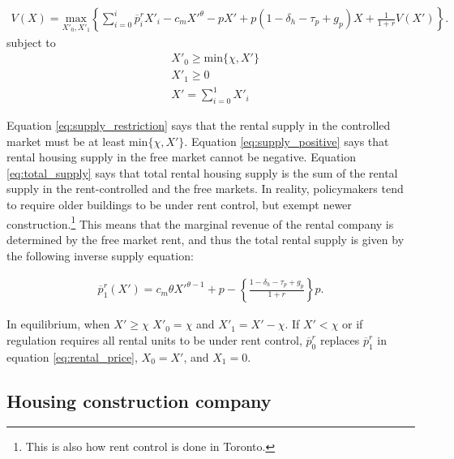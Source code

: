 \documentclass[parskip=full]{article}
\begin{document}

\begin{align}\label{eq:rental_company_problem}
V(X)=\underset{X'_{0},X'_{1}} {\text{$\mbox{max} $}}\left\{\sum_{i=0}^{i} \overline{p}^{r}_{i}X'_{i}-c_{m}X'^{\theta}-p X'+p(1-\delta_{h}-\tau_{p}+g_{p})X+\frac{1}{1+r}V(X')\right\}.
\end{align}
subject to
\begin{align}
& X'_{0} \geq \mbox{min}\{\chi,X'\} \label{eq:supply_restriction} \\
& X'_{1} \geq 0 \label{eq:supply_positive} \\
& X'=\sum^{1}_{i=0} X'_{i} \label{eq:total_supply} 
\end{align}

\noindent Equation \ref{eq:supply_restriction} says that the rental supply in the controlled market must be at least $\mbox{min}\{\chi,X'\}$. Equation \ref{eq:supply_positive} says that rental housing supply in the free market cannot be negative. Equation \ref{eq:total_supply} says that total rental housing supply is the sum of the rental supply in the rent-controlled and the free markets. In reality, policymakers tend to require older buildings to be under rent control, but exempt newer construction.\footnote{This is also how rent control is done in Toronto.} This means that the marginal revenue of the rental company is determined by the free market rent, and thus the total rental supply is given by the following inverse supply equation:

\begin{align}
\overline{p}^{r}_{1}(X')=c_{m}\theta X'^{\theta-1}+p-\left\{\frac{1-\delta_{h}-\tau_p+g_{p}}{1+r}\right\}p.\label{eq:rental_price}
\end{align}

\noindent In equilibrium, when $X'\geq \chi$ $X'_{0}=\chi$ and $X'_{1}=X'-\chi$. If $X'<\chi$ or if regulation requires all rental units to be under rent control, $\overline{p}^{r}_{0}$ replaces $\overline{p}^{r}_{1}$ in equation \ref{eq:rental_price}, $X_{0}=X'$, and $X_{1}=0$.

\subsection{Housing construction company}
\end{document}
